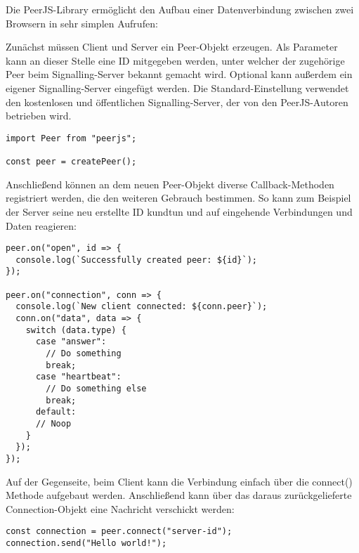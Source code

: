 Die PeerJS-Library ermöglicht den Aufbau einer Datenverbindung zwischen zwei Browsern in sehr simplen Aufrufen:

Zunächst müssen Client und Server ein Peer-Objekt erzeugen. Als Parameter kann an dieser Stelle eine ID mitgegeben werden, unter welcher der zugehörige Peer beim Signalling-Server bekannt gemacht wird. Optional kann außerdem ein eigener Signalling-Server eingefügt werden. Die Standard-Einstellung verwendet den kostenlosen und öffentlichen Signalling-Server, der von den PeerJS-Autoren betrieben wird.

\begin{lstlisting}
import Peer from "peerjs";

const peer = createPeer();
\end{lstlisting}

Anschließend können an dem neuen Peer-Objekt diverse Callback-Methoden registriert werden, die den weiteren Gebrauch bestimmen. So kann zum Beispiel der Server seine neu erstellte ID kundtun und auf eingehende Verbindungen und Daten reagieren:

\begin{lstlisting}
peer.on("open", id => {
  console.log(`Successfully created peer: ${id}`);
});

peer.on("connection", conn => {
  console.log(`New client connected: ${conn.peer}`);
  conn.on("data", data => {
    switch (data.type) {
      case "answer":
        // Do something
        break;
      case "heartbeat":
        // Do something else
        break;
      default:
      // Noop
    }
  });
});
\end{lstlisting}

Auf der Gegenseite, beim Client kann die Verbindung einfach über die connect() Methode aufgebaut werden. Anschließend kann über das daraus zurückgelieferte Connection-Objekt eine Nachricht verschickt werden:

\begin{lstlisting}
const connection = peer.connect("server-id");
connection.send("Hello world!");
\end{lstlisting}